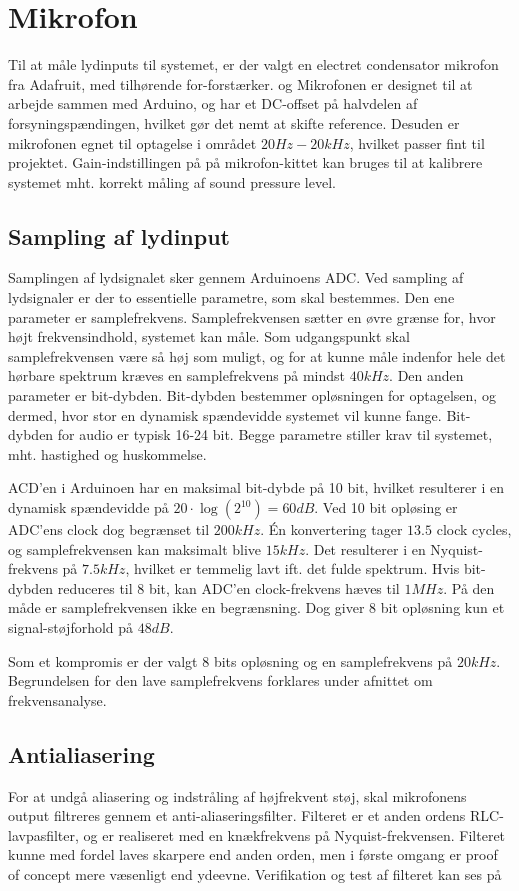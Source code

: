\section{Mikrofon}
Til at måle lydinputs til systemet, er der valgt en electret condensator mikrofon fra Adafruit, med tilhørende for-forstærker. \cite{manual_mic} og \cite{manual_amp} 
Mikrofonen er designet til at arbejde sammen med Arduino, og har et DC-offset på halvdelen af forsyningspændingen, hvilket gør det nemt at skifte reference. 
Desuden er mikrofonen egnet til optagelse i området $20 Hz - 20 kHz$, hvilket passer fint til projektet. 
Gain-indstillingen på på mikrofon-kittet kan bruges til at kalibrere systemet mht. korrekt måling af sound pressure level. 

\subsection{Sampling af lydinput}
Samplingen af lydsignalet sker gennem Arduinoens ADC. 
Ved sampling af lydsignaler er der to essentielle parametre, som skal bestemmes.
Den ene parameter er samplefrekvens. 
Samplefrekvensen sætter en øvre grænse for, hvor højt frekvensindhold, systemet kan måle. 
Som udgangspunkt skal samplefrekvensen være så høj som muligt, og for at kunne måle indenfor hele det hørbare spektrum kræves en samplefrekvens på mindst $40 kHz$. 
Den anden parameter er bit-dybden.
Bit-dybden bestemmer opløsningen for optagelsen, og dermed, hvor stor en dynamisk spændevidde systemet vil kunne fange. 
Bit-dybden for audio er typisk 16-24 bit. 
Begge parametre stiller krav til systemet, mht. hastighed og huskommelse. 

ACD'en i Arduinoen har en maksimal bit-dybde på 10 bit, hvilket resulterer i en dynamisk spændevidde på $ 20 \cdot \log (2^{10}) = 60 dB$. 
Ved 10 bit opløsing er ADC'ens clock dog begrænset til $200 kHz$. 
Én konvertering tager $13.5$ clock cycles, og samplefrekvensen kan maksimalt blive $ 15 kHz$.
Det resulterer i en Nyquist-frekvens på $7.5 kHz$, hvilket er temmelig lavt ift. det fulde spektrum. 
Hvis bit-dybden reduceres til 8 bit, kan ADC'en clock-frekvens hæves til $1 MHz$. 
På den måde er samplefrekvensen ikke en begrænsning. 
Dog giver 8 bit opløsning kun et signal-støjforhold på $48 dB$. 

Som et kompromis er der valgt 8 bits opløsning og en samplefrekvens på $20 kHz$.
Begrundelsen for den lave samplefrekvens forklares under afnittet om frekvensanalyse. 

\subsection{Antialiasering}
For at undgå aliasering og indstråling af højfrekvent støj, skal mikrofonens output filtreres gennem et anti-aliaseringsfilter.
Filteret er et anden ordens RLC-lavpasfilter, og er realiseret med en knækfrekvens på Nyquist-frekvensen. 
Filteret kunne med fordel laves skarpere end anden orden, men i første omgang er proof of concept mere væsenligt end ydeevne. 
Verifikation og test af filteret kan ses på %

